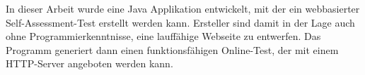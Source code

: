 \label{Abstract}
In dieser Arbeit wurde eine Java Applikation entwickelt, mit der ein webbasierter Self-Assessment-Test erstellt werden kann. 
Ersteller sind damit in der Lage auch ohne Programmierkenntnisse, eine lauffähige Webseite zu entwerfen.
Das Programm generiert dann einen funktionsfähigen Online-Test, der mit einem HTTP-Server angeboten werden kann.
